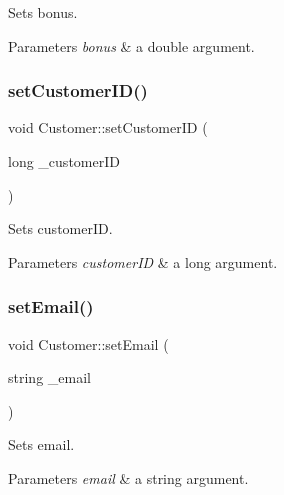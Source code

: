 Sets bonus. 


\begin{DoxyParams}{Parameters}
{\em bonus} & a double argument. \\
\hline
\end{DoxyParams}
\mbox{\label{classCustomer_acc7237a0121638d38846465ee9c2d26a}} 
\subsubsection{\texorpdfstring{set\+Customer\+I\+D()}{setCustomerID()}}
{\footnotesize\ttfamily void Customer\+::set\+Customer\+ID (\begin{DoxyParamCaption}\item[{long}]{\+\_\+customer\+ID }\end{DoxyParamCaption})}



Sets customer\+ID. 


\begin{DoxyParams}{Parameters}
{\em customer\+ID} & a long argument. \\
\hline
\end{DoxyParams}
\mbox{\label{classCustomer_aff04d3f21f7546c394d28f7b42994719}} 
\subsubsection{\texorpdfstring{set\+Email()}{setEmail()}}
{\footnotesize\ttfamily void Customer\+::set\+Email (\begin{DoxyParamCaption}\item[{string}]{\+\_\+email }\end{DoxyParamCaption})}



Sets email. 


\begin{DoxyParams}{Parameters}
{\em email} & a string argument. \\
\hline
\end{DoxyParams}
\mbox{\label{classCustomer_a57953fc7e96939d1937fc7603aa31406}} 
